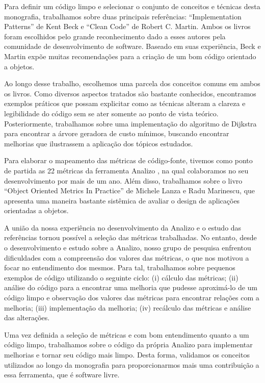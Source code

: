 Para definir um código limpo e selecionar o conjunto de conceitos e técnicas desta monografia, trabalhamos sobre duas principais referências:
``Implementation Patterns'' \citep{Beck2007} de Kent Beck e ``Clean Code'' \citep{Martin2008} de Robert C. Martin. Ambos os livros foram escolhidos
pelo grande reconhecimento dado a esses autores pela comunidade de desenvolvimento de software. Baseado em suas experiência, Beck e Martin
expõe muitas recomendações para a criação de um bom código orientado a objetos.

Ao longo desse trabalho, escolhemos uma parcela dos conceitos comuns em ambos os livros. Como diversos aspectos tratados são bastante
conhecidos, encontramos exemplos práticos que possam explicitar como as técnicas alteram a clareza e legibilidade do código sem se ater
somente ao ponto de vista teórico. Posteriormente, trabalhamos sobre uma implementação do algoritmo de Dijkstra para encontrar a árvore geradora de
custo mínimos, buscando encontrar melhorias que ilustrassem a aplicação dos tópicos estudados.

Para elaborar o mapeamento das métricas de código-fonte, tivemos como ponto de
partida as 22 métricas da ferramenta Analizo \cite{analizo2010}, na qual colaboramos no seu desenvolvimento por mais de um ano.
Além disso, trabalhamos sobre o livro ``Object Oriented Metrics In Practice'' \cite{Lanza06} de Michele Lanza e Radu Marinescu, que apresenta uma
maneira bastante sistêmica de avaliar o design de aplicações orientadas a objetos.

A união da nossa experiência no desenvolvimento da Analizo e o estudo das referências
tornou possível a seleção das métricas trabalhadas. No entanto, desde o desenvolvimento e estudo sobre a Analizo, nosso grupo
de pesquisa enfrentou dificuldades com a compreensão dos valores das métricas, o que nos motivou a focar no entendimento dos mesmos. Para tal,
trabalhamos sobre pequenos exemplos de código utilizando o seguinte ciclo: (i) cálculo das métricas; (ii) análise do código para a encontrar uma melhoria
que pudesse aproximá-lo de um código limpo e observação dos valores das métricas para encontrar relações com a melhoria; (iii) implementação da melhoria;
(iv) recálculo das métricas e análise das alterações.

Uma vez definida a seleção de métricas e com bom entendimento quanto a um código limpo, trabalhamos sobre o código da própria Analizo para implementar
melhorias e tornar seu código mais limpo. Desta forma, validamos os conceitos utilizados ao longo da monografia para proporcionarmos mais uma contribuição a essa ferramenta, que é software livre.

